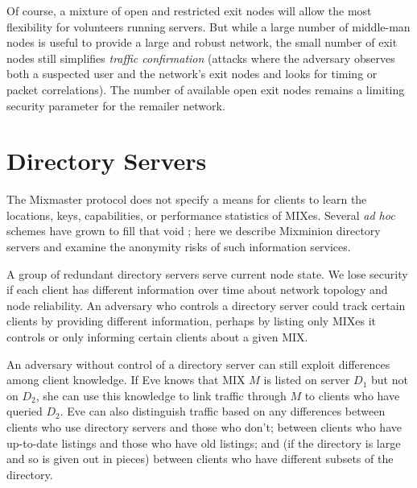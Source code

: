 \documentclass{llncs}
\begin{document}
Of course, a mixture of open and restricted exit nodes will allow the
most flexibility for volunteers running servers. But while a large number
of middle-man nodes is useful to provide a large and robust network, the
small number of exit nodes still simplifies \emph{traffic confirmation}
(attacks where the adversary observes both a suspected user and the
network's exit nodes and looks for timing or packet correlations). The
number of available open exit nodes remains a limiting security parameter
for the remailer network.


\section{Directory Servers}
\label{sec:dir-servers}

The Mixmaster protocol does not specify a means for clients to learn the
locations, keys, capabilities, or performance statistics of MIXes. Several
\emph{ad hoc} schemes have grown to fill that void \cite{levien}; here
we describe Mixminion directory servers and examine the anonymity risks
of such information services.

A group of redundant directory servers serve current node state. We lose
security if each client has different information over time about network
topology and node reliability. An adversary who controls a directory
server could track certain clients by providing different information,
perhaps by listing only MIXes it controls or only informing certain
clients about a given MIX.

An adversary without control of a directory server can still exploit
differences among client knowledge. If Eve knows that MIX $M$ is listed
on server $D_1$ but not on $D_2$, she can use this knowledge to link
traffic through $M$ to clients who have queried $D_2$.  Eve can also
distinguish traffic based on any differences between clients who use
directory servers and those who don't; between clients who have up-to-date
listings and those who have old listings; and (if the directory is large
and so is given out in pieces) between clients who have different subsets
of the directory.
\end{document}
